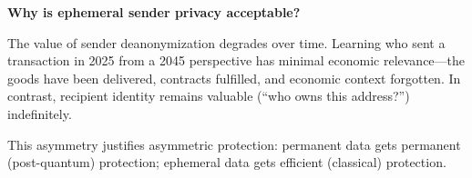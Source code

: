 \textbf{Why is ephemeral sender privacy acceptable?}

The value of sender deanonymization degrades over time. Learning who
sent a transaction in 2025 from a 2045 perspective has minimal economic
relevance---the goods have been delivered, contracts fulfilled, and
economic context forgotten. In contrast, recipient identity remains
valuable (``who owns this address?'') indefinitely.

This asymmetry justifies asymmetric protection: permanent data gets
permanent (post-quantum) protection; ephemeral data gets efficient
(classical) protection.
